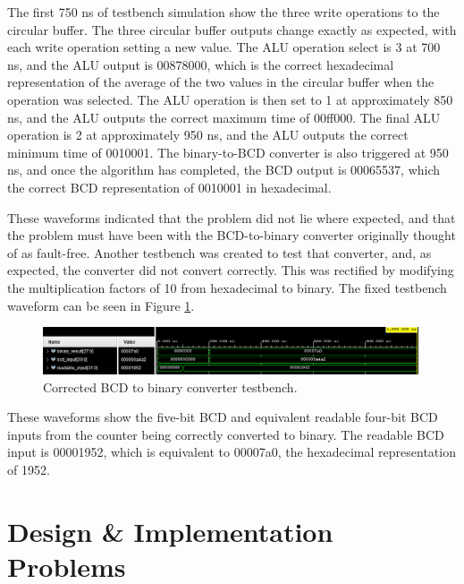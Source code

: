 \documentclass[11pt]{article}
\begin{document}
The first 750 ns of testbench simulation show the three write operations to the circular buffer. The three circular buffer outputs change exactly as expected, with each write operation setting a new value. The ALU operation select is 3 at 700 ns, and the ALU output is 00878000, which is the correct hexadecimal representation of the average of the two values in the circular buffer when the operation was selected. The ALU operation is then set to 1 at approximately 850 ns, and the ALU outputs the correct maximum time of 00ff000. The final ALU operation is 2 at approximately 950 ns, and the ALU outputs the correct minimum time of 0010001. The binary-to-BCD converter is also triggered at 950 ns, and once the algorithm has completed, the BCD output is 00065537, which the correct BCD representation of 0010001 in hexadecimal.

These waveforms indicated that the problem did not lie where expected, and that the problem must have been with the BCD-to-binary converter originally thought of as fault-free. Another testbench was created to test that converter, and, as expected, the converter did not convert correctly. This was rectified by modifying the multiplication factors of 10 from hexadecimal to binary. The fixed testbench waveform can be seen in Figure \ref{fig:correct_converter_tb}.

\begin{figure}[H]
  \centering
  \includegraphics[width=0.99\textwidth]{WhatsApp Image 2025-05-08 at 16.13.24}
  \caption{Corrected BCD to binary converter testbench.}
  \label{fig:correct_converter_tb}
\end{figure}

These waveforms show the five-bit BCD and equivalent readable four-bit BCD inputs from the counter being correctly converted to binary. The readable BCD input is 00001952, which is equivalent to 00007a0, the hexadecimal representation of 1952.

\section{Design \& Implementation Problems}
\end{document}
